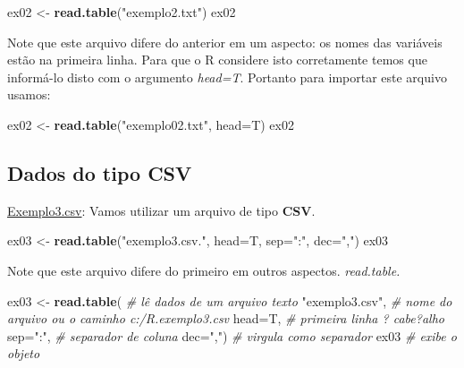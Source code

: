 \documentclass[]{book}
\newenvironment{Shaded}{\begin{snugshade}}{\end{snugshade}}
\newcommand{\CommentTok}[1]{\textcolor[rgb]{0.56,0.35,0.01}{\textit{#1}}}
\newcommand{\DataTypeTok}[1]{\textcolor[rgb]{0.13,0.29,0.53}{#1}}
\newcommand{\KeywordTok}[1]{\textcolor[rgb]{0.13,0.29,0.53}{\textbf{#1}}}
\newcommand{\NormalTok}[1]{#1}
\newcommand{\StringTok}[1]{\textcolor[rgb]{0.31,0.60,0.02}{#1}}
\begin{document}
\begin{Shaded}
\begin{Highlighting}[]
\NormalTok{ex02 <-}\StringTok{ }\KeywordTok{read.table}\NormalTok{(}\StringTok{"exemplo2.txt"}\NormalTok{) }
\NormalTok{ex02}
\end{Highlighting}
\end{Shaded}

Note que este arquivo difere do anterior em um aspecto: os nomes das variáveis estão na primeira linha. Para que o R considere isto corretamente temos que informá-lo disto com o argumento \emph{head=T}. Portanto para importar este arquivo usamos:

\begin{Shaded}
\begin{Highlighting}[]
\NormalTok{ex02 <-}\StringTok{ }\KeywordTok{read.table}\NormalTok{(}\StringTok{"exemplo02.txt"}\NormalTok{, }\DataTypeTok{head=}\NormalTok{T) }
\NormalTok{ex02}
\end{Highlighting}
\end{Shaded}

\hypertarget{dados-do-tipo-csv}{%
\subsection{Dados do tipo CSV}\label{dados-do-tipo-csv}}

\href{https://www.dropbox.com/s/mv13cmkysw2nizm/exemplo3.csv?dl=1}{Exemplo3.csv}: Vamos utilizar um arquivo de tipo \textbf{CSV}.

\begin{Shaded}
\begin{Highlighting}[]
\NormalTok{ex03 <-}\StringTok{ }\KeywordTok{read.table}\NormalTok{(}\StringTok{"exemplo3.csv."}\NormalTok{, }\DataTypeTok{head=}\NormalTok{T, }\DataTypeTok{sep=}\StringTok{":"}\NormalTok{, }\DataTypeTok{dec=}\StringTok{","}\NormalTok{) }
\NormalTok{ex03}
\end{Highlighting}
\end{Shaded}

Note que este arquivo difere do primeiro em outros aspectos.
\emph{read.table.}

\begin{Shaded}
\begin{Highlighting}[]
\NormalTok{ex03 <-}\StringTok{ }\KeywordTok{read.table}\NormalTok{(       }\CommentTok{# lê dados de um arquivo texto}
  \StringTok{"exemplo3.csv"}\NormalTok{,         }\CommentTok{# nome do arquivo ou o caminho c:/R.exemplo3.csv}
  \DataTypeTok{head=}\NormalTok{T,                 }\CommentTok{# primeira linha ? cabe?alho}
  \DataTypeTok{sep=}\StringTok{":"}\NormalTok{,                }\CommentTok{# separador de coluna }
  \DataTypeTok{dec=}\StringTok{","}\NormalTok{)                }\CommentTok{# virgula como separador}
\NormalTok{ex03                      }\CommentTok{# exibe o objeto}
\end{Highlighting}
\end{Shaded}
\end{document}
